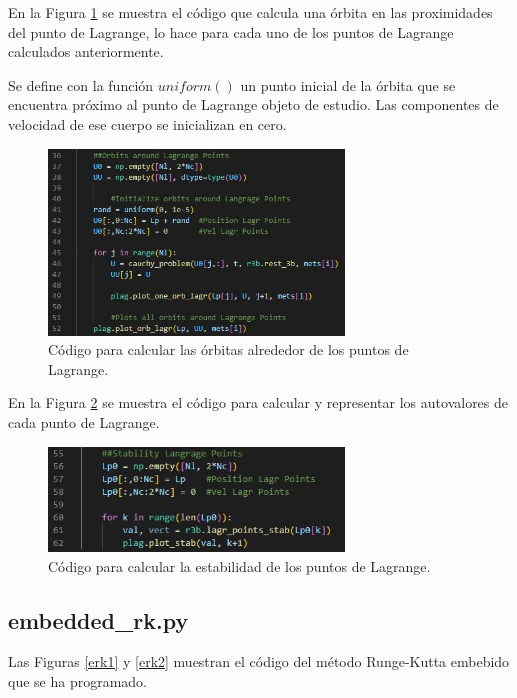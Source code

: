 \documentclass[12pt,a4paper]{article}
\begin{document}
En la Figura  \ref{main3} se muestra el código que calcula una órbita en las proximidades del punto de Lagrange, lo hace para cada uno de los puntos de Lagrange calculados anteriormente. 

Se define con la función $uniform()$ un punto inicial de la órbita que se encuentra próximo al punto de Lagrange objeto de estudio. Las componentes de velocidad de ese cuerpo se inicializan en cero.
\begin{figure}[H]
	\centering
	\includegraphics[width=0.7\textwidth]{FIGURES/mil6/codigo/main3.JPG}
	\caption{Código para calcular las órbitas alrededor de los puntos de Lagrange.}
	\label{main3}
\end{figure}

En la Figura \ref{main4} se muestra el código para calcular y representar los autovalores de cada punto de Lagrange.
\begin{figure}[H]
	\centering
	\includegraphics[width=0.7\textwidth]{FIGURES/mil6/codigo/main4.JPG}
	\caption{Código para calcular la estabilidad de los puntos de Lagrange.}
	\label{main4}
\end{figure}

\subsection{embedded\_rk.py}
Las Figuras \ref{erk1} y \ref{erk2} muestran el código del método Runge-Kutta embebido que se ha programado. 
\end{document}
